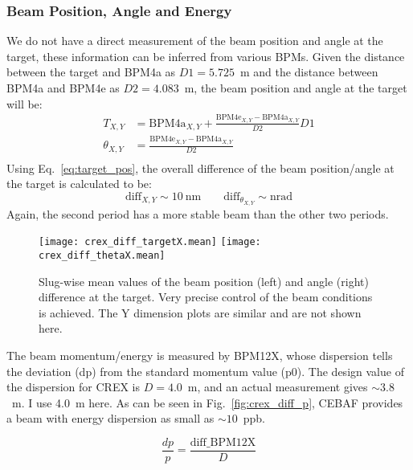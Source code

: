 \subsubsection{Beam Position, Angle and Energy}
We do not have a direct measurement of the beam position and angle at the target, these 
information can be inferred from various BPMs. Given the 
distance between the target and BPM4a as $D1 = 5.725$~m and the distance
between BPM4a and BPM4e as $D2 =4.083$~m, the beam position and angle at the target 
will be:
\begin{equation}
    \begin{aligned}
	T_{X,Y} &= \text{BPM4a}_{X,Y} + \frac{\text{BPM4e}_{X,Y} - \text{BPM4a}_{X,Y}}{D2} D1	\\
	\theta_{X,Y} &= \frac{\text{BPM4e}_{X,Y} - \text{BPM4a}_{X,Y}}{D2} \\
    \end{aligned}
    \label{eq:target_pos}
\end{equation}
Using Eq.~\ref{eq:target_pos}, the overall difference of the beam position/angle 
at the target is calculated to be:
\begin{equation*}
    \text{diff}_{X,Y} \sim 10\ \mathrm{nm}	\qquad \text{diff}_{\theta_{X,Y}} \sim \mathrm{nrad}	
\end{equation*}
Again, the second period has a more stable beam than the other two periods.

\begin{figure}[!h]
    \centering
    \texttt{[image: crex\_diff\_targetX.mean]}
    \texttt{[image: crex\_diff\_thetaX.mean]}
    \caption[Slug-wise plot of beam position and angle]
    {Slug-wise mean values of the beam position (left) and angle (right) 
    difference at the target. 
    Very precise control of the beam conditions is achieved.
    The Y dimension plots are similar and are not shown here.}
\end{figure}

The beam momentum/energy is measured by BPM12X, whose dispersion tells the deviation
(dp) from the standard momentum value (p0). The design value of the dispersion for CREX is
$D = 4.0$~m, and an actual measurement gives $\sim3.8$~m. I use 4.0~m here.
As can be seen in Fig.~\ref{fig:crex_diff_p}, CEBAF provides a beam with energy 
dispersion as small as $\sim10$~ppb.

\begin{equation}
    \frac{dp}{p} = \frac{\text{diff\_BPM12X}}{D}
\end{equation}

